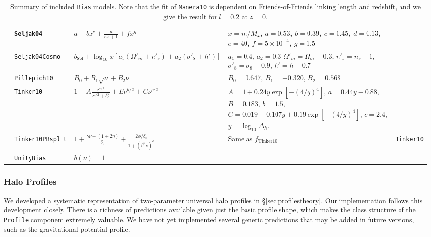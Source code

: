 \documentclass[5p,aas_macros]{elsarticle}
\providecommand{\DIFaddtex}[1]{{\protect\color{blue}\uwave{#1}}} %
\providecommand{\DIFdeltex}[1]{{\protect\color{red}\sout{#1}}}                      %
\providecommand{\DIFaddFL}[1]{\DIFadd{#1}} %
\providecommand{\DIFdelFL}[1]{\DIFdel{#1}} %
\providecommand{\DIFaddbeginFL}{} %
\providecommand{\DIFaddendFL}{} %
\providecommand{\DIFdelbeginFL}{} %
\providecommand{\DIFdelendFL}{} %
\providecommand{\DIFadd}[1]{\texorpdfstring{\DIFaddtex{#1}}{#1}} %
\providecommand{\DIFdel}[1]{\texorpdfstring{\DIFdeltex{#1}}{}} %
\begin{document}
\begin{table}
\begin{tabular}{>{\raggedright}m{3cm} >{\raggedright}m{2.6cm} >{\raggedright}m{5.2cm} >{\raggedright\arraybackslash}m{4.2cm} >{\raggedright\arraybackslash}m{1.2cm}}
\citet{Seljak2004} & \texttt{Seljak04} & $\displaystyle a + bx^c + \frac{d}{ex+1} + fx^g$ & $x=m/M_\star$, $a=0.53$, $b=0.39$, $c=0.45$, $d=0.13$, $e=40$, $f=5\times10^{-4}$, $g=1.5$ & \\
\midrule
\citet{Seljak2004} & \texttt{Seljak04Cosmo} & $\displaystyle b_\text{Sel} + \log_{10}x \left[a_1(\Omega'_m + n'_s) + a_2(\sigma'_8 + h')\right]$ & $a_1 = 0.4$, $a_2=0.3$ $\Omega'_m=\Omega_m-0.3$, $n'_s = n_s-1$, $\sigma'_8 = \sigma_8-0.9$, $h' = h-0.7$& \\
\midrule
\citet{Pillepich2010} & \texttt{Pillepich10} & $\displaystyle B_0 + B_1\sqrt{\nu} + B_2\nu$ & $B_0=0.647$, $B_1=-0.320$, $B_2=0.568$ & \\
\midrule
 \citet{Tinker2010} & \texttt{Tinker10} & $\displaystyle 1 - A\frac{\nu^{a/2}}{\nu^{a/2} + \delta_c^a} + B\nu^{b/2} + C\nu^{c/2}$ & $A=1+0.24y\exp[-(4/y)^4]$, $a = 0.44 y - 0.88$, $B = 0.183$, $b = 1.5$, $C = 0.019+0.107y+0.19\exp[-(4/y)^4]$, $c = 2.4$, \DIFdelbeginFL \DIFdelFL{$y=\log_{10}\Delta_h$}\DIFdelendFL \DIFaddbeginFL \DIFaddFL{$y=\log_{10}\Delta_{\rm h}$}\DIFaddendFL . &  \\
 \midrule
 \citet{Tinker2010} & \texttt{Tinker10PBsplit} & $\displaystyle 1 + \frac{\gamma\nu-(1+2\eta)}{\delta_c} + \frac{2\phi/\delta_c}{1+(\beta^2\nu)^\phi}$ & Same as $f_\text{Tinker10}$ & \texttt{Tinker10} \\
 \midrule
 & \texttt{UnityBias} & $b(\nu) = 1$ & & \\
 \bottomrule
 \end{tabular}
 \caption[Summary of included \texttt{Bias} models]{Summary of included \texttt{Bias} models. Note that the fit of \texttt{Manera10} is dependent on Friends-of-Friends linking length and redshift, and we give the result for $l = 0.2$ at $z=0$.}

\label{tab:models_bias}

\end{table}
\endgroup

\subsubsection{Halo Profiles}
\label{sec:halomod:components:profile}
We developed a systematic representation of two-param\-eter universal halo profiles in \S\ref{sec:profilestheory}. Our implementation follows this development closely. There is a richness of predictions available given just the basic profile shape, which makes the class structure of the \verb|Profile| component extremely valuable. We have not yet implemented several generic predictions that may be added in future versions, such as the gravitational potential profile.
\end{document}
